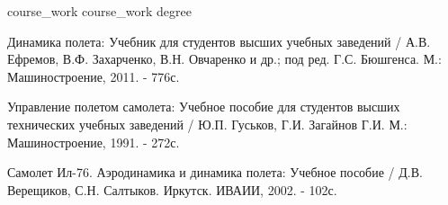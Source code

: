 \documentclass[bachelor, 14pt, substylefile = spbu.rtx]{disser}
\begin{document}

\newpage
\renewcommand{\contentsname}{\center{\large СОДЕРЖАНИЕ}}
\tableofcontents
{course_work}
{course_work}
{degree}


\begin{thebibliography}{2}
Динамика полета: Учебник для студентов высших учебных
заведений / А.В. Ефремов, В.Ф. Захарченко, В.Н. Овчаренко и др.; под ред. Г.С.
Бюшгенса. М.: Машиностроение, 2011. - 776с.

Управление полетом самолета: Учебное пособие для
студентов высших технических учебных заведений / Ю.П. Гуськов, Г.И. Загайнов
Г.И. М.: Машиностроение, 1991. - 272с. 

Самолет Ил-76. Аэродинамика и динамика полета: Учебное пособие / Д.В. Верещиков, 
С.Н. Салтыков. Иркутск. ИВАИИ, 2002. - 102с. 
\end{thebibliography}
\end{document}
